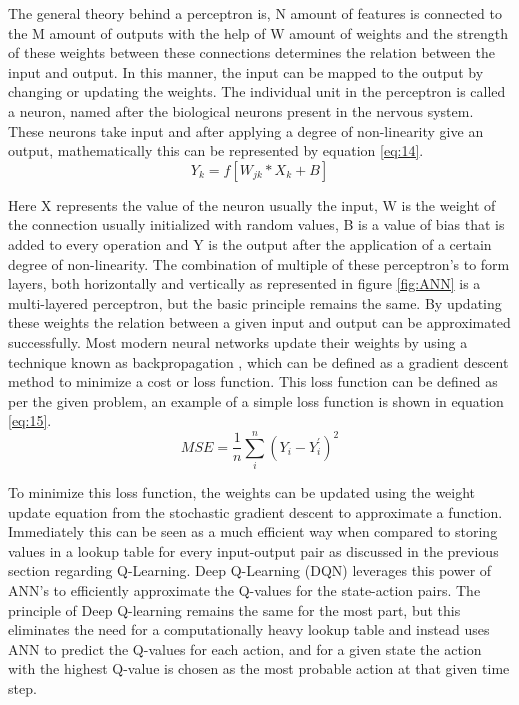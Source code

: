 The general theory behind a perceptron is, N amount of features is connected to the M amount of outputs with the help of W amount of weights and the strength of these weights between these connections determines the relation between the input and output. In this manner, the input can be mapped to the output by changing or updating the weights. The individual unit in the perceptron is called a neuron, named after the biological neurons present in the nervous system. These neurons take input and after applying a degree of non-linearity give an output, mathematically this can be represented by equation \ref{eq:14}. \\

\begin{equation}\label{eq:14}
    Y_k = \textit{f} [W_{jk} * X_k + B]
\end{equation}

Here X represents the value of the neuron usually the input, W is the weight of the connection usually initialized with random values, B is a value of bias that is added to every operation and Y is the output after the application of a certain degree of non-linearity. The combination of multiple of these perceptron's to form layers, both horizontally and vertically as represented in figure \ref{fig:ANN} is a multi-layered perceptron, but the basic principle remains the same. By updating these weights the relation between a given input and output can be approximated successfully. Most modern neural networks update their weights by using a technique known as backpropagation \cite{kelley1960gradient}, which can be defined as a gradient descent method to minimize a cost or loss function. This loss function can be defined as per the given problem, an example of a simple loss function is shown in equation \ref{eq:15}. \\

\begin{equation}\label{eq:15}
    MSE = \frac{1}{n} \sum_{i}^{n} (Y_i - Y_i^{'})^2
\end{equation}

To minimize this loss function, the weights can be updated using the weight update equation from the stochastic gradient descent \cite{ruder2016overview} to approximate a function. Immediately this can be seen as a much efficient way when compared to storing values in a lookup table for every input-output pair as discussed in the previous section regarding Q-Learning. Deep Q-Learning (DQN) \cite{mnih2013playing} leverages this power of ANN's to efficiently approximate the Q-values for the state-action pairs. The principle of Deep Q-learning remains the same for the most part, but this eliminates the need for a computationally heavy lookup table and instead uses ANN to predict the Q-values for each action, and for a given state the action with the highest Q-value is chosen as the most probable action at that given time step. \\

